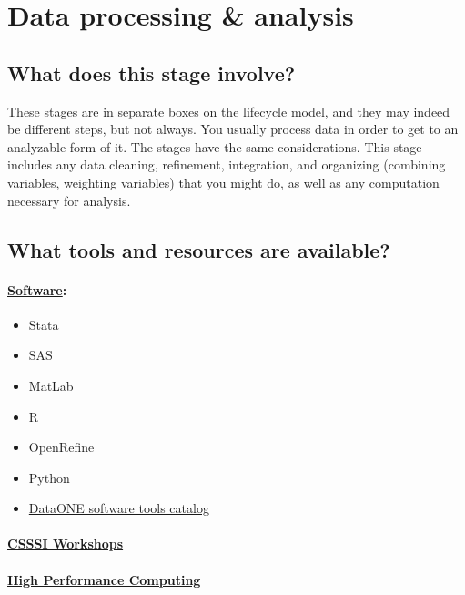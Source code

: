 \documentclass[]{article}
\begin{document}
\section{Data processing \& analysis}\label{data-processing-analysis}

\subsection{What does this stage
involve?}\label{what-does-this-stage-involve-2}

These stages are in separate boxes on the lifecycle model, and they may
indeed be different steps, but not always. You usually process data in
order to get to an analyzable form of it. The stages have the same
considerations. This stage includes any data cleaning, refinement,
integration, and organizing (combining variables, weighting variables)
that you might do, as well as any computation necessary for analysis.

\subsection{What tools and resources are
available?}\label{what-tools-and-resources-are-available-2}

\paragraph{\href{http://csssi.yale.edu/tech}{Software}:}\label{software}

\begin{itemize}
\itemsep1pt\parskip0pt
\item
  Stata
\item
  SAS
\item
  MatLab
\item
  R
\item
  OpenRefine
\item
  Python
\item
  \href{http://www.dataone.org/software_tools_catalog}{DataONE software
  tools catalog}
\end{itemize}

\paragraph{\href{http://statlab.stat.yale.edu/workshops/}{CSSSI
Workshops}}\label{csssi-workshops}

\paragraph{\href{http://its.yale.edu/services/research-technologies/high-performance-computing}{High
Performance Computing}}\label{high-performance-computing}
\end{document}
